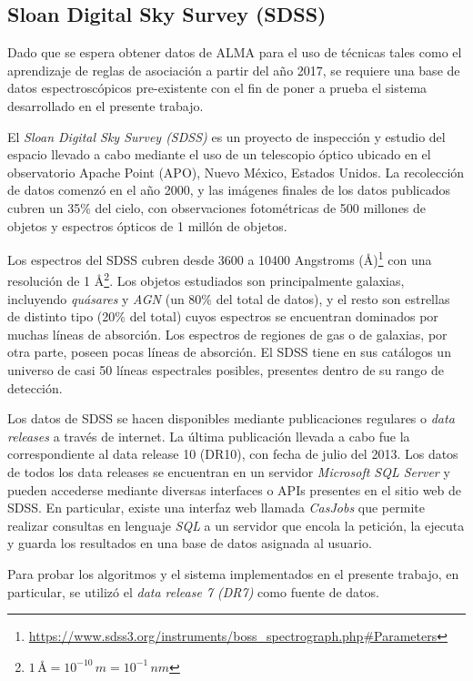 \subsection{Sloan Digital Sky Survey (SDSS)}

Dado que se espera obtener datos de ALMA para el uso de técnicas tales como el aprendizaje de reglas de asociación a partir del año 2017, se requiere una base de datos espectroscópicos pre-existente con el fin de poner a prueba el sistema desarrollado en el presente trabajo.

El \textit{Sloan Digital Sky Survey (SDSS)} es un proyecto de inspección y estudio del espacio llevado a cabo mediante el uso de un telescopio óptico ubicado en el observatorio Apache Point (APO), Nuevo México, Estados Unidos. La recolección de datos comenzó en el año 2000, y las imágenes finales de los datos publicados cubren un 35\% del cielo, con observaciones fotométricas de 500 millones de objetos y espectros ópticos de 1 millón de objetos.

Los espectros del SDSS cubren desde 3600 a 10400 Angstroms ({\AA})\footnote{\url{https://www.sdss3.org/instruments/boss_spectrograph.php\#Parameters}} con una resolución de 1 {\AA}\footnote{$1\,\text{{\AA}} = 10^{-10}\,m = 10^{-1}\,nm$}. Los objetos estudiados son principalmente galaxias, incluyendo \textit{quásares} y \textit{AGN} (un 80\% del total de datos), y el resto son estrellas de distinto tipo (20\% del total) cuyos espectros se encuentran dominados por muchas líneas de absorción. Los espectros de regiones de gas o de galaxias, por otra parte, poseen pocas líneas de absorción. El SDSS tiene en sus catálogos un universo de casi 50 líneas espectrales posibles, presentes dentro de su rango de detección.

Los datos de SDSS se hacen disponibles mediante publicaciones regulares o \textit{data releases} a través de internet. La última publicación llevada a cabo fue la correspondiente al data release 10 (DR10), con fecha de julio del 2013. Los datos de todos los data releases se encuentran en un servidor \textit{Microsoft SQL Server} y pueden accederse mediante diversas interfaces o APIs presentes en el sitio web de SDSS. En particular, existe una interfaz web llamada \textit{CasJobs} que permite realizar consultas en lenguaje \textit{SQL} a un servidor que encola la petición, la ejecuta y guarda los resultados en una base de datos asignada al usuario.

Para probar los algoritmos y el sistema implementados en el presente trabajo, en particular, se utilizó el \textit{data release 7 (DR7)} como fuente de datos.

